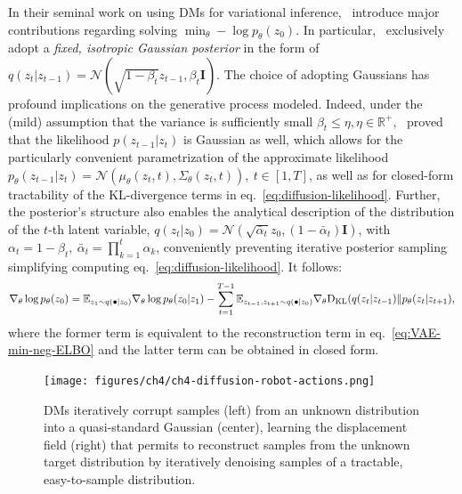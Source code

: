 In their seminal work on using DMs for variational inference,~\citet{hoDenoisingDiffusionProbabilistic2020} introduce major contributions regarding solving \( \min_\theta -\log p_\theta(z_0) \).
In particular,~\citet{hoDenoisingDiffusionProbabilistic2020} exclusively adopt a \emph{fixed, isotropic Gaussian posterior} in the form of \( q(z_t \vert z_{t-1}) = \mathcal{N}(\sqrt{1-\beta_t}z_{t-1}, \beta_t \mathbf I) \).
The choice of adopting Gaussians has profound implications on the generative process modeled. 
Indeed, under the (mild) assumption that the variance is sufficiently small \( \beta_t \leq \eta, \eta \in \mathbb R^+ \),~\citet{sohnLearningStructuredOutput2015} proved that the likelihood \( p(z_{t-1} \vert z_t) \) is Gaussian as well, which allows for the particularly convenient parametrization of the approximate likelihood \( p_\theta (z_{t-1} \vert z_t) = \mathcal N(\mu_\theta(z_t, t), \Sigma_\theta(z_t,t)), \ t \in [1,T] \), as well as for closed-form tractability of the KL-divergence terms in eq.~\ref{eq:diffusion-likelihood}.
Further, the posterior's structure also enables the analytical description of the distribution of the \( t\)-th latent variable, \( q(z_t \vert z_0) = \mathcal N (\sqrt{\bar{\alpha}_t}z_0, (1-\bar{\alpha}_t) \mathbf{I}) \), with \( \alpha_t = 1-\beta_t, \ \bar \alpha_t = \prod_{k=1}^t \alpha_k \), conveniently preventing iterative posterior sampling simplifying computing eq.~\ref{eq:diffusion-likelihood}.
It follows:
\begin{align}
    \nabla_\theta \log p_\theta (z_0) = \mathbb E_{z_1 \sim q(\bullet \vert z_0)} \nabla_\theta \log p_\theta (z_0 \vert z_1) - \sum_{t=1}^{T-1} \mathbb E_{z_{t-1}, z_{t+1} \sim q(\bullet \vert z_0)} \nabla_\theta \text{D}_{\text{KL}} (q(z_t \vert z_{t-1}) \Vert p_\theta(z_t \vert z_{t+1}), \label{eq:diffusion-likelihood-gradient}
\end{align}
where the former term is equivalent to the reconstruction term in eq.~\ref{eq:VAE-min-neg-ELBO} and the latter term can be obtained in closed form.


\begin{figure}
    \centering
    \texttt{[image: figures/ch4/ch4-diffusion-robot-actions.png]}
    \caption{DMs iteratively corrupt samples (left) from an unknown distribution into a quasi-standard Gaussian (center), learning the displacement field (right) that permits to reconstruct samples from the unknown target distribution by iteratively denoising samples of a tractable, easy-to-sample distribution.}
    \label{fig:diffusion-robot-actions}
\end{figure}

